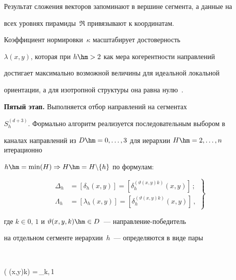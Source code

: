   


  Результат сложения векторов запоминают в вершине сегмента, а данные на 


всех уровнях пирамиды~$\mathfrak{R}$ привязывают к координатам. 


Коэффициент нормировки~$\kappa$ масштабирует достоверность 


$\lambda(x,y)$, которая при $h\hm>2$ как мера когерентности направлений 


достигает максимально возможной величины для идеальной локальной 


ориентации, а для изотропной структуры она равна нулю~\cite{4-gk}.


  


  \textbf{Пятый этап.} Выполняется отбор направлений на сегментах 


$S_h^{(d+3)}$. Формально алгоритм реализуется последовательным выбором в 


каналах направлений из $D\hm=0, \ldots ,3$ для иерархии $H\hm=2, \ldots ,n$ итерационно 


$h\hm=\min(H)\Rightarrow H\hm= H\backslash \{h\}$ по формулам:


  \begin{equation}


  \left.


  \begin{array}{rl}


  \Delta_h &= \left[ \delta_h(x,y)\right] = \left[ 


\delta_h^{(\vartheta(x,y)k)}(x,y)\right]\,; %


\\[9pt]


  \Lambda_h &= \left[ \lambda_h(x,y)\right] = \left[ 


\delta_h^{(\vartheta(x,y)k)}(x,y)\right]\,,


\end{array}


\right\}


\label{e21-gk}


  \end{equation}


где $k\in 0,\,1$ и $\vartheta (x,y,k)\hm\in D$~---  на\-прав\-ле\-ние-по\-бе\-ди\-тель 


на отдельном сегменте иерархии~$h$~---  определяются в виде пары


$$


\left( \vartheta (x,y)k\right) =\,\max\limits_{k,\,1} 


